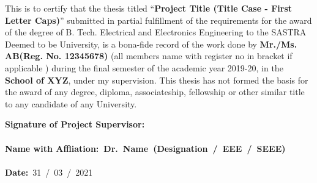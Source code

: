 \documentclass[a4paper, 12pt, oneside]{sastra}
\begin{document}
	
	
	
	
	
	
	\newpage
	
	\setcounter{page}{2}
	
	\certificate
	
	
	\begin{doublespace}
		\linespread{2}
		
		This is to certify that the thesis titled ``\textbf{Project Title (Title Case - First Letter Caps)}'' submitted in partial fulfillment of the requirements for the award of the degree of B. Tech. Electrical and Electronics Engineering to the SASTRA Deemed to be University, is a bona-fide record of the work done by \textbf{Mr./Ms. AB(Reg. No. 12345678)} (all members name with register no in bracket if applicable ) during the final semester of the academic year 2019-20, in the \textbf{School of XYZ}, under my supervision. This thesis has not formed the basis for the award of any degree, diploma, associateship, fellowship or other similar title to any candidate of any University.
		
	\end{doublespace}
	\vspace*{0.4in}
	
\noindent\textbf{Signature of Project Supervisor:}~	\\ %
\\
\textbf{Name with Affliation\hspace*{19mm}:~\textbf{Dr.~Name}~(Designation~/~EEE~/~SEEE)}	\\
\\
	\textbf{Date\hspace*{48.25mm}:}~31~/~03~/~2021\\%
	
\end{document}
